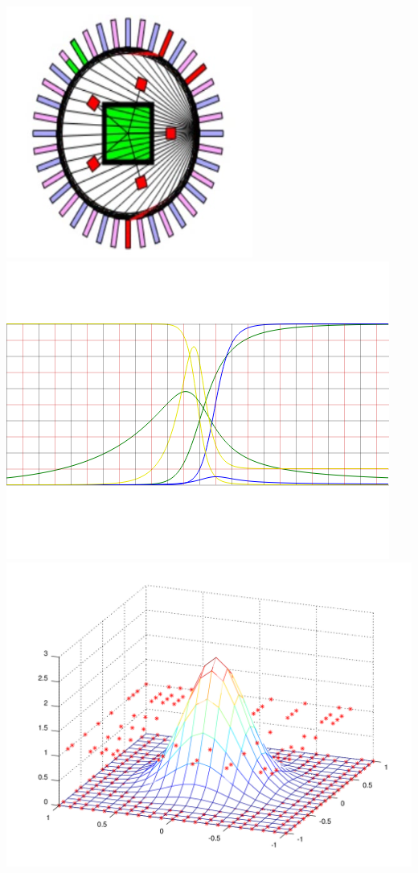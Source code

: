 \documentclass[../resume.tex]{subfiles}
\begin{document}
\href{https://www.youtube.com/watch?v=mAyUxTdrQnU}{\includegraphics[scale=0.2]{../scientific/neuron_bot.png}}
\includegraphics[scale=0.15]{../scientific/nmh_inf_tau.png} 
\includegraphics[scale=0.15]{../scientific/2dconv.png} 
\end{document}
